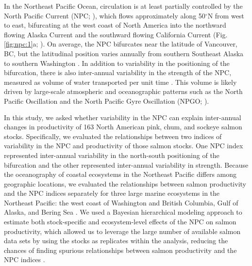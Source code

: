 In the Northeast Pacific Ocean, circulation is at least partially controlled by
the North Pacific Current (NPC; \citealp{Ware1989a, Cummins2007a}), which flows
approximately along 50$^{\circ}$N from west to east, bifurcating at the west
coast of North America into the northward flowing Alaska Current and the
southward flowing California Current (Fig. \ref{fig:npc:1}a; \citealp{Ware1989a,
Chelton1982a}). On average, the NPC bifurcates near the latitude of Vancouver,
BC, but the latitudinal position varies annually from southern Southeast Alaska
to southern Washington \citep{Cummins2007a, Sydeman2011a}. In addition to
variability in the positioning of the bifurcation, there is also inter-annual
variability in the strength of the NPC, measured as volume of water transported
per unit time \citep{Freeland2006a, Cummins2007a}. This volume is likely driven
by large-scale atmospheric and oceanographic patterns such as the North Pacific
Oscillation and the North Pacific Gyre Oscillation (NPGO;
\citealp{Di-Lorenzo2008a}).

In this study, we asked whether variability in the NPC can explain inter-annual
changes in productivity of 163 North American pink, chum, and sockeye salmon
stocks. Specifically, we evaluated the relationships between two indices of
variability in the NPC and productivity of those salmon stocks. One NPC index
represented inter-annual variability in the north-south positioning of the
bifurcation and the other represented inter-annual variability in strength.
Because the oceanography of coastal ecosystems in the Northeast Pacific differs
among geographic locations, we evaluated the relationships between salmon
productivity and the NPC indices separately for three large marine ecosystems in
the Northeast Pacific: the west coast of Washington and British Columbia, Gulf
of Alaska, and Bering Sea \citep{Sherman1999, Longhurst1995}. We used a Bayesian
hierarchical modeling approach to estimate both stock-specific and
ecosystem-level effects of the NPC on salmon productivity, which allowed us to
leverage the large number of available salmon data sets by using the stocks as
replicates within the analysis, reducing the chances of finding spurious
relationships between salmon productivity and the NPC indices \citep{Myers1998c,
Thorson2015b, Mueter2002a}.

